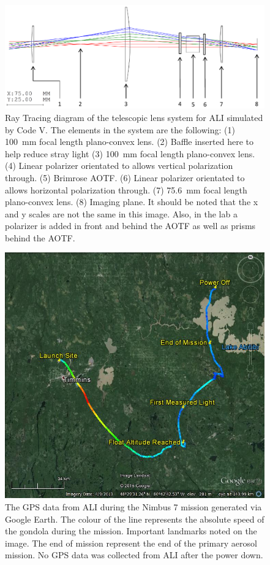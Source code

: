 \documentclass[12pt]{article}
\begin{document}
\begin{figure}[h!]
    \includegraphics[width=1.0\textwidth]{./Images/3-2-TelescopicRayTracing.pdf}
    \caption[ALI Telescopic Design Prototype]{Ray Tracing diagram of the telescopic lens system for ALI simulated by Code V. The elements in the system are the following: (1) 100~mm focal length plano-convex lens. (2) Baffle inserted here to help reduce stray light (3) 100~mm focal length plano-convex lens. (4) Linear polarizer orientated to allows vertical polarization through. (5) Brimrose AOTF. (6) Linear polarizer orientated to allows horizontal polarization through. (7) 75.6~mm focal length plano-convex lens. (8) Imaging plane. It should be noted that the x and y scales are not the same in this image. Also, in the lab a polarizer is added in front and behind the AOTF as well as prisms behind the AOTF.}
    \label{fig:3.2:telescopicRayTracing}
\end{figure}

\begin{figure}[h!]
    \includegraphics[width=1.0\textwidth]{./Images/5-1-AliGpsDataGoogleMaps.jpg}
    \caption[Flight Path of the Nimbus 7 Mission]{The GPS data from ALI during the Nimbus 7 mission generated via Google Earth. The colour of the line represents the absolute speed of the gondola during the mission. Important landmarks noted on the image. The end of mission represent the end of the primary aerosol mission. No GPS data was collected from ALI after the power down.}
    \label{fig:5.1:nimbus7FlightPath}
\end{figure}
\end{document}
